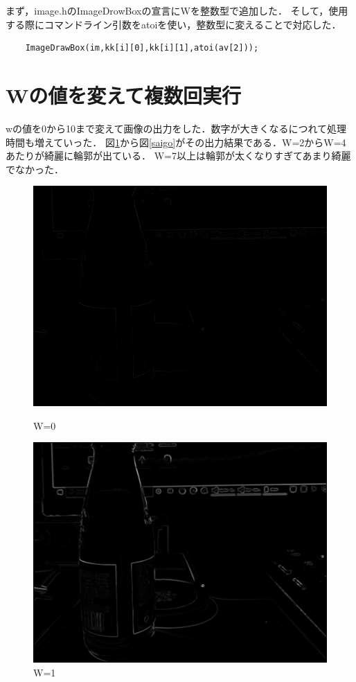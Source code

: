 \documentclass[11pt]{jarticle}
\begin{document}
まず，image.hのImageDrowBoxの宣言にWを整数型で追加した．
そして，使用する際にコマンドライン引数をatoiを使い，整数型に変えることで対応した．
\begin{verbatim}
    ImageDrawBox(im,kk[i][0],kk[i][1],atoi(av[2]));
\end{verbatim}

\section{Wの値を変えて複数回実行}
wの値を0から10まで変えて画像の出力をした．数字が大きくなるにつれて処理時間も増えていった．
図\ref{saisyo}から図\ref{saigo}がその出力結果である．W=2からW=4あたりが綺麗に輪郭が出ている．
W=7以上は輪郭が太くなりすぎてあまり綺麗でなかった．
\begin{figure}[t]
    \begin{minipage}{0.5\hsize}
        \centering
        \includegraphics[scale=.3]{w0.jpg}
        \caption{W=0}
        \label{saisyo}
    \end{minipage}
    \begin{minipage}{0.5\hsize}
        \centering
        \includegraphics[scale=.3]{w1.jpg}
        \caption{W=1}
    \end{minipage}
\end{figure}
\end{document}
